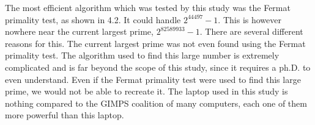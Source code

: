 \documentclass[main.tex]{subfiles}
\begin{document}
The most efficient algorithm which was tested by this study was the Fermat
primality test, as shown in 4.2. It could handle $2^{44497}-1$. This is however
nowhere near the current largest prime, $2^{82589933}-1$. There are several
different reasons for this. The current largest prime was not even found using
the Fermat primality test. The algorithm used to find this large number is
extremely complicated and is far beyond the scope of this study, since it
requires a ph.D. to even understand. Even if the Fermat primality test were used
to find this large prime, we would not be able to recreate it. The laptop used
in this study is nothing compared to the GIMPS coalition of many computers, each
one of them more powerful than this laptop. 


 
\end{document}
